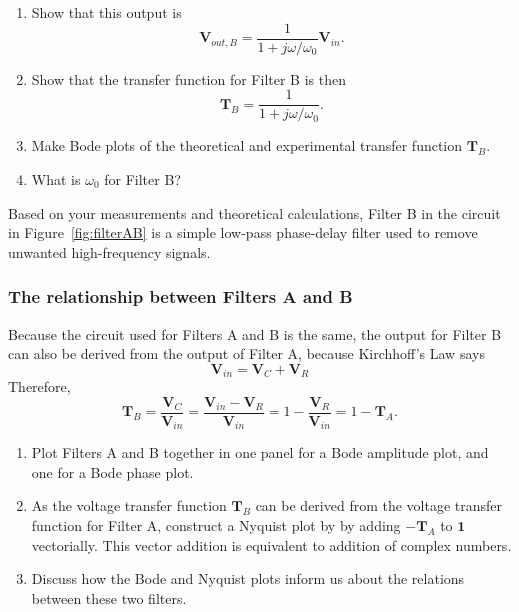 \documentclass{article}
\begin{document}
\begin{enumerate}[resume]
\item Show that this output is
  \begin{equation}
    \mathbf{V}_{out, B}=
    {\frac {1}{1+j\omega/\omega_0}}\mathbf{V}_{in}.
  \end{equation}
  
\item Show that the transfer function for Filter B is then
\begin{equation}
  \mathbf{T}_B =
  \frac{1}{1+j\omega/\omega_0}.
\end{equation}
\item Make Bode plots of the theoretical and experimental transfer
  function $\mathbf{T}_B$.
\item What is $\omega_0$ for Filter B? 
\end{enumerate}
Based on your measurements and theoretical calculations, Filter B in
the circuit in Figure~\ref{fig:filterAB} is a simple low-pass
phase-delay filter used to remove unwanted high-frequency signals.

\subsubsection*{The relationship between Filters A and B}
Because the circuit used for Filters A and B is the same, the output
for Filter B can also be derived from the output of Filter A, because
Kirchhoff's Law says
\begin{equation}
  \mathbf{V}_{in}=\mathbf{V}_C+\mathbf{V}_R
\end{equation}
Therefore,
\begin{equation}
  \mathbf{T}_B =\frac{\mathbf{V}_C}{\mathbf{V}_{in}}
  =\frac{\mathbf{V}_{in}-\mathbf{V}_R}{\mathbf{V}_{in}}
  =1-\frac{\mathbf{V}_R}{\mathbf{V}_{in}}
  =1-\mathbf{T}_A.
\end{equation}

\begin{enumerate}[resume]
\item Plot Filters A and B together in one panel for a Bode amplitude
  plot, and one for a Bode phase plot.
\item As the voltage transfer function $\mathbf{T}_B$ can be derived
  from the voltage transfer function for Filter A, construct a Nyquist
  plot by by adding $-\mathbf{T}_A$ to $\mathbf{1}$ vectorially. This
  vector addition is equivalent to addition of complex numbers.
\item Discuss how the Bode and Nyquist plots inform us about the relations
  between these two filters.
\end{enumerate}
\end{document}
